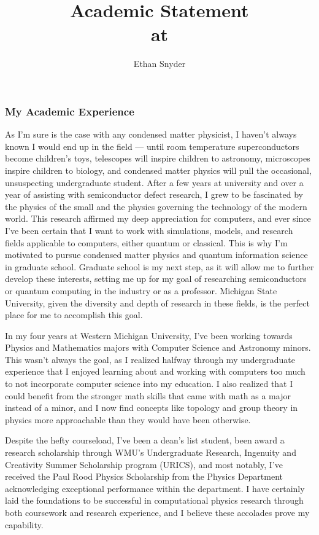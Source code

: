 \documentclass[11pt]{article}
\title{Academic Statement\\
	\large \dept{} at \school{}}
\author{Ethan Snyder}
\date{}
\newcommand{\school}{Michigan State University}
\begin{document}
\maketitle
\subsubsection*{My Academic Experience}
As I'm sure is the case with any condensed matter physicist, I haven't always known I would end up in the field --- until room temperature superconductors become children's toys, telescopes will inspire children to astronomy, microscopes inspire children to biology, and condensed matter physics will pull the occasional, unsuspecting undergraduate student. After a few years at university and over a year of assisting with semiconductor defect research, I grew to be fascinated by the physics of the small and the physics governing the technology of the modern world. This research affirmed my deep appreciation for computers, and ever since I've been certain that I want to work with simulations, models, and research fields applicable to computers, either quantum or classical. This is why I'm motivated to pursue condensed matter physics and quantum information science in graduate school. Graduate school is my next step, as it will allow me to further develop these interests, setting me up for my goal of researching semiconductors or quantum computing in the industry or as a professor. \school{}, given the diversity and depth of research in these fields, is the perfect place for me to accomplish this goal.

In my four years at Western Michigan University, I've been working towards Physics and Mathematics majors with Computer Science and Astronomy minors. This wasn't always the goal, as I realized halfway through my undergraduate experience that I enjoyed learning about and working with computers too much to not incorporate computer science into my education. I also realized that I could benefit from the stronger math skills that came with math as a major instead of a minor, and I now find concepts like topology and group theory in physics more approachable than they would have been otherwise.

Despite the hefty courseload, I've been a dean's list student, been award a research scholarship through WMU's Undergraduate Research, Ingenuity and Creativity Summer Scholarship program (URICS), and most notably, I've received the Paul Rood Physics Scholarship from the Physics Department acknowledging exceptional performance within the department. I have certainly laid the foundations to be successful in computational physics research through both coursework and research experience, and I believe these accolades prove my capability.
\end{document}
